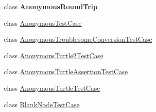 \begin{DoxyCompactItemize}
\item 
class {\bfseries Anonymous\-Round\-Trip}
\item 
class \hyperlink{classorg_1_1semanticweb_1_1owlapi_1_1api_1_1test_1_1anonymous_1_1_anonymous_test_case}{Anonymous\-Test\-Case}
\item 
class \hyperlink{classorg_1_1semanticweb_1_1owlapi_1_1api_1_1test_1_1anonymous_1_1_anonymous_troublesome_conversion_test_case}{Anonymous\-Troublesome\-Conversion\-Test\-Case}
\item 
class \hyperlink{classorg_1_1semanticweb_1_1owlapi_1_1api_1_1test_1_1anonymous_1_1_anonymous_turtle2_test_case}{Anonymous\-Turtle2\-Test\-Case}
\item 
class \hyperlink{classorg_1_1semanticweb_1_1owlapi_1_1api_1_1test_1_1anonymous_1_1_anonymous_turtle_assertion_test_case}{Anonymous\-Turtle\-Assertion\-Test\-Case}
\item 
class \hyperlink{classorg_1_1semanticweb_1_1owlapi_1_1api_1_1test_1_1anonymous_1_1_anonymous_turtle_test_case}{Anonymous\-Turtle\-Test\-Case}
\item 
class \hyperlink{classorg_1_1semanticweb_1_1owlapi_1_1api_1_1test_1_1anonymous_1_1_blank_node_test_case}{Blank\-Node\-Test\-Case}
\end{DoxyCompactItemize}
